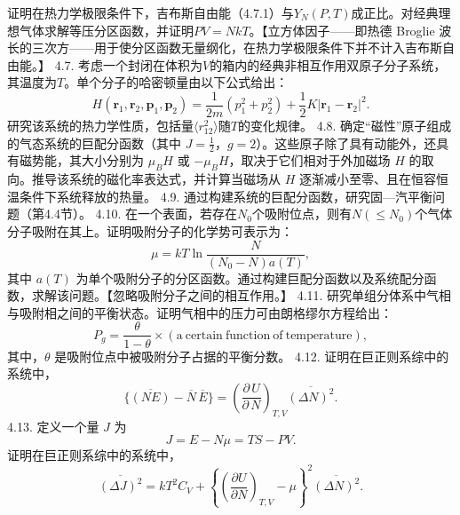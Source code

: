 证明在热力学极限条件下，吉布斯自由能（4.7.1）与\(Y_{N}(P,T)\)成正比。对经典理想气体求解等压分区函数，并证明\(PV=NkT\)。【立方体因子——即热德 Broglie 波长的三次方——用于使分区函数无量纲化，在热力学极限条件下并不计入吉布斯自由能。】
4.7. 考虑一个封闭在体积为\(V\)的箱内的经典非相互作用双原子分子系统，其温度为\(T\)。单个分子的哈密顿量由以下公式给出：
\begin{equation}\tag{4.5.29}\label{eq:4.5.29}
H ( \pmb { r } _ { 1 } , \pmb { r } _ { 2 } , \pmb { p } _ { 1 } , \pmb { p } _ { 2 } ) = \frac { 1 } { 2 m } ( p _ { 1 } ^{2} + p _ { 2 } ^{2} ) + \frac { 1 } { 2 } K | \pmb { r } _ { 1 } - \pmb { r } _ { 2 } | ^{2} .
\end{equation}
研究该系统的热力学性质，包括量\(\langle r_{12}^{2}\rangle\)随\(T\)的变化规律。
4.8. 确定“磁性”原子组成的气态系统的巨配分函数（其中 \(J=\frac{1}{2}\)，\(g=2\)）。这些原子除了具有动能外，还具有磁势能，其大小分别为 \(\mu_{B}H\) 或 \(-\mu_{B}H\)，取决于它们相对于外加磁场 \(H\) 的取向。推导该系统的磁化率表达式，并计算当磁场从 \(H\) 逐渐减小至零、且在恒容恒温条件下系统释放的热量。
4.9. 通过构建系统的巨配分函数，研究固---汽平衡问题（第4.4节）。
4.10. 在一个表面，若存在\(N_0\)个吸附位点，则有\(N(\leq N_0)\)个气体分子吸附在其上。证明吸附分子的化学势可表示为：
\begin{equation}\tag{4.5.30}\label{eq:4.5.30}
\mu = k T \ln \frac { N } { ( N _ { 0 } - N ) a ( T ) } ,
\end{equation}
其中 \(a(T)\) 为单个吸附分子的分区函数。通过构建巨配分函数以及系统配分函数，求解该问题。【忽略吸附分子之间的相互作用。】
4.11. 研究单组分体系中气相与吸附相之间的平衡状态。证明气相中的压力可由朗格缪尔方程给出：
\begin{equation}\tag{4.5.31}\label{eq:4.5.31}
P _ { g } = \frac { \theta } { 1 - \theta } \times ( \mathrm { a ~ c e r t a i n ~ f u n c t i o n ~ o f ~ t e m p e r a t u r e } ) ,
\end{equation}
其中，\(\theta\) 是吸附位点中被吸附分子占据的平衡分数。
4.12. 证明在巨正则系综中的系统中，
\begin{equation}\tag{4.5.32}\label{eq:4.5.32}
\{ \overline { { ( N E ) } } - \overline { { N } } \, \overline { { E } } \} = \left( \frac { \partial \, U } { \partial \, N } \right) _ { T , V } \overline { { ( \Delta N ) ^{2} } } .
\end{equation}
4.13. 定义一个量 \(J\) 为
\begin{equation}\tag{4.5.33}\label{eq:4.5.33}
J = E - N \mu = T S - P V .
\end{equation}
证明在巨正则系综中的系统中，
\begin{equation}\tag{4.5.34}\label{eq:4.5.34}
\overline { { ( \Delta J ) ^{2} } } = k T ^{2} C _ { V } + \left\{ \left( \frac { \partial U } { \partial N } \right) _ { T , V } - \mu \right\} ^{2} \overline { { ( \Delta N ) ^{2} } } .
\end{equation}
